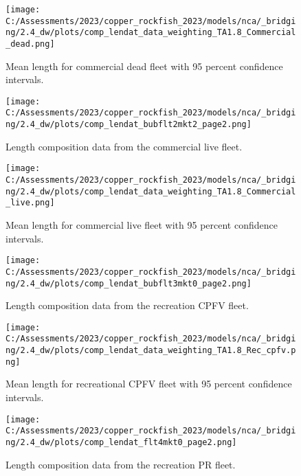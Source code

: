 \documentclass[11pt,
  english,
  letterpaper,
]{article}
\begin{document}
\begin{figure}
\centering
\texttt{[image: C:/Assessments/2023/copper\_rockfish\_2023/models/nca/\_bridging/2.4\_dw/plots/comp\_lendat\_data\_weighting\_TA1.8\_Commercial\_dead.png]}
\caption{Mean length for commercial dead fleet with 95 percent confidence intervals.\label{fig:mean-com-dead-len-data}}
\end{figure}

\begin{figure}
\centering
\texttt{[image: C:/Assessments/2023/copper\_rockfish\_2023/models/nca/\_bridging/2.4\_dw/plots/comp\_lendat\_bubflt2mkt2\_page2.png]}
\caption{Length composition data from the commercial live fleet.\label{fig:com-live-len-data}}
\end{figure}

\begin{figure}
\centering
\texttt{[image: C:/Assessments/2023/copper\_rockfish\_2023/models/nca/\_bridging/2.4\_dw/plots/comp\_lendat\_data\_weighting\_TA1.8\_Commercial\_live.png]}
\caption{Mean length for commercial live fleet with 95 percent confidence intervals.\label{fig:mean-com-live-len-data}}
\end{figure}

\begin{figure}
\centering
\texttt{[image: C:/Assessments/2023/copper\_rockfish\_2023/models/nca/\_bridging/2.4\_dw/plots/comp\_lendat\_bubflt3mkt0\_page2.png]}
\caption{Length composition data from the recreation CPFV fleet.\label{fig:rec-cpfv-len-data}}
\end{figure}

\begin{figure}
\centering
\texttt{[image: C:/Assessments/2023/copper\_rockfish\_2023/models/nca/\_bridging/2.4\_dw/plots/comp\_lendat\_data\_weighting\_TA1.8\_Rec\_cpfv.png]}
\caption{Mean length for recreational CPFV fleet with 95 percent confidence intervals.\label{fig:mean-rec-cpfv-len-data}}
\end{figure}

\begin{figure}
\centering
\texttt{[image: C:/Assessments/2023/copper\_rockfish\_2023/models/nca/\_bridging/2.4\_dw/plots/comp\_lendat\_flt4mkt0\_page2.png]}
\caption{Length composition data from the recreation PR fleet.\label{fig:rec-pr-len-data}}
\end{figure}
\end{document}
